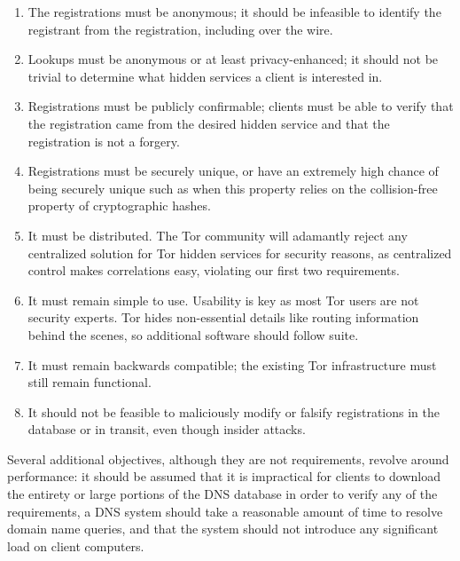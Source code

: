 \begin{enumerate}
	\item The registrations must be anonymous; it should be infeasible to identify the registrant from the registration, including over the wire.
	\item Lookups must be anonymous or at least privacy-enhanced; it should not be trivial to determine what hidden services a client is interested in.
	\item Registrations must be publicly confirmable; clients must be able to verify that the registration came from the desired hidden service and that the registration is not a forgery.
	\item Registrations must be securely unique, or have an extremely high chance of being securely unique such as when this property relies on the collision-free property of cryptographic hashes.
	\item It must be distributed. The Tor community will adamantly reject any centralized solution for Tor hidden services for security reasons, as centralized control makes correlations easy, violating our first two requirements.
	\item It must remain simple to use. Usability is key as most Tor users are not security experts. Tor hides non-essential details like routing information behind the scenes, so additional software should follow suite.
	\item It must remain backwards compatible; the existing Tor infrastructure must still remain functional.
	\item It should not be feasible to maliciously modify or falsify registrations in the database or in transit, even though insider attacks.
\end{enumerate}

Several additional objectives, although they are not requirements, revolve around performance: it should be assumed that it is impractical for clients to download the entirety or large portions of the DNS database in order to verify any of the requirements, a DNS system should take a reasonable amount of time to resolve domain name queries, and that the system should not introduce any significant load on client computers.